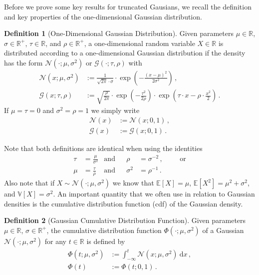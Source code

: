 \documentclass[a4paper]{article}
\newcommand{\Real}{{\mathbb R}}
\newcommand{\Normal}[3]{{\mathcal N} \left({#1};{#2},{#3}\right)}
\newcommand{\Gauss}[3]{{\mathcal G} \left({#1};{#2},{#3}\right)}
\newcommand{\NormalStandard}[1]{{\mathcal N} \left({#1}\right)}
\newcommand{\GaussStandard}[1]{{\mathcal G} \left({#1}\right)}
\newcommand{\NormalCDF}[3]{\Phi \left({#1};{#2},{#3}\right)}
\newcommand{\NormalStandardCDF}[1]{\Phi \left({#1}\right)}
\newcommand{\expect}[1]{{\mathbb E \left[ {#1} \right]}}
\newcommand{\var}[1]{{\mathbb V \left[ {#1} \right]}}
\newcommand{\intd}[1]{\ \mathrm{d}{#1}}
\theoremstyle{definition}
\newtheorem{definition}{Definition}
\begin{document}
Before we prove some key results for truncated Gausians, we recall the definition and key properties of the one-dimensional Gaussian distribution.
\begin{definition}[One-Dimensional Gaussian Distribution]
    Given parameters $\mu \in \Real$, $\sigma \in \Real^+$, $\tau \in \Real$, and $\rho \in \Real^+$, a one-dimensional random variable $X \in \Real$ is distributed according to a one-dimensional Gaussian distribution if the density has the form $\Normal{\cdot}{\mu}{\sigma^2}$ or $\Gauss{\cdot}{\tau}{\rho}$ with
    \begin{align}
        \Normal{x}{\mu}{\sigma^2} & := \frac{1}{\sqrt{2\pi}\cdot \sigma} \cdot \exp \left( -\frac{(x-\mu)^2}{2\sigma^2}\right) \,, \label{eq:Normal_definition} \\
        \Gauss{x}{\tau}{\rho}     & := \sqrt{\frac{\rho}{2\pi}} \cdot \exp\left(-\frac{\tau^2}{2\rho} \right) \cdot \exp \left(\tau\cdot x - \rho \cdot \frac{x^2}{2} \right) \,. \label{eq:Gauss_definition}
    \end{align}
    If $\mu = \tau = 0$ and $\sigma^2 = \rho = 1$ we simply write 
    \begin{align}
        \NormalStandard{x} & := \Normal{x}{0}{1} \,, \\
        \GaussStandard{x}  & := \Gauss{x}{0}{1} \,.
    \end{align}
\end{definition}
Note that both definitions are identical when using the identities
\begin{align}
    \tau & = \frac{\mu}{\sigma^2} & \mbox{and} &  & \rho     & = \sigma^{-2}\,,                                       &  &  & \mbox{or} \\
    \mu  & = \frac{\tau}{\rho}    & \mbox{and} &  & \sigma^2 & = \rho^{-1} \,. \label{eq:Gauss_Normal_transformation}
\end{align}
Also note that if $X \sim \Normal{\cdot}{\mu}{\sigma^2}$ we know that $\expect{X}=\mu$, $\expect{X^2}=\mu^2 + \sigma^2$, and $\var{X}=\sigma^2$. An important quantity that we often use in relation to Gaussian densities is the cumulative distribution function (cdf) of the Gaussian density.
\begin{definition}[Gaussian Cumulative Distribution Function] \label{def:gaussian_cdf}
    Given parameters $\mu \in \Real$, $\sigma \in \Real^+$, the cumulative distribution function $\NormalCDF{\cdot}{\mu}{\sigma^2}$ of a Gaussian $\Normal{\cdot}{\mu}{\sigma^2}$ for any $t\in \Real$ is defined by
    \begin{align}
        \NormalCDF{t}{\mu}{\sigma^2} & := \int_{-\infty}^t \Normal{x}{\mu}{\sigma^2}\intd{x} \,, \\
        \NormalStandardCDF{t}        & := \NormalCDF{t}{0}{1} \,.
    \end{align}
\end{definition}
\end{document}
